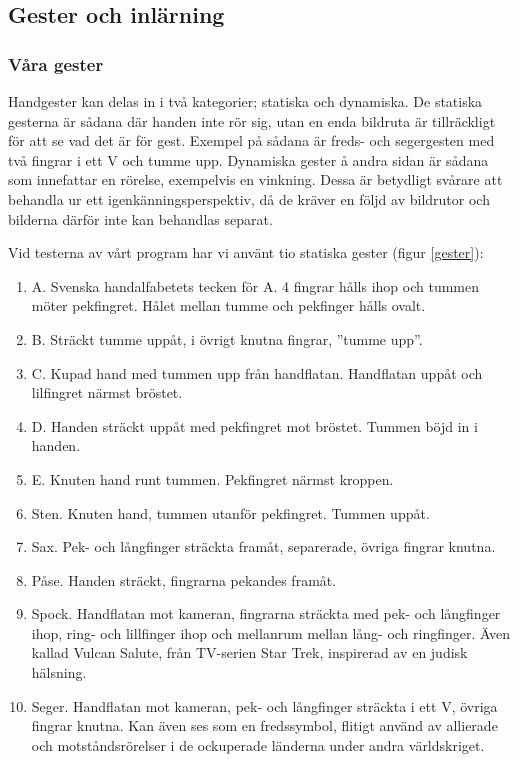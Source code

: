 \documentclass[../rapport_MVEX01-11-05]{subfiles}
\begin{document}
\subsection{Gester och inlärning}
\subsubsection{Våra gester}
Handgester kan delas in i två kategorier; statiska och dynamiska. De
statiska gesterna är sådana där handen inte rör sig, utan en enda
bildruta är tillräckligt för att se vad det är för gest. Exempel på
sådana är freds- och segergesten med två fingrar i ett V och tumme
upp. Dynamiska gester å andra sidan är sådana som innefattar en
rörelse, exempelvis en vinkning. Dessa är betydligt svårare att
behandla ur ett igenkänningsperspektiv, då de kräver en följd av
bildrutor och bilderna därför inte kan behandlas separat.

Vid testerna av vårt program har vi använt tio statiska gester (figur
\ref{gester}):


\begin{enumerate}
\item A. Svenska handalfabetets tecken för A. 4 fingrar hålls ihop och tummen
  möter pekfingret. Hålet mellan tumme och pekfinger hålls ovalt.

\item B. Sträckt tumme uppåt, i övrigt knutna fingrar, ''tumme upp''.

\item C. Kupad hand med tummen upp från handflatan. Handflatan uppåt
  och lilfingret närmst bröstet. 

\item D. Handen sträckt uppåt med pekfingret mot bröstet. Tummen böjd
  in i handen.

\item E. Knuten hand runt tummen. Pekfingret närmst kroppen. 

\item Sten. Knuten hand, tummen utanför pekfingret. Tummen uppåt.

\item Sax. Pek- och långfinger sträckta framåt, separerade, övriga
  fingrar knutna.

\item Påse. Handen sträckt, fingrarna pekandes framåt.

\item Spock. Handflatan mot kameran, fingrarna sträckta med pek- och
  långfinger ihop, ring- och lillfinger ihop och mellanrum mellan
  lång- och ringfinger. Även kallad Vulcan Salute, från TV-serien Star
  Trek, inspirerad av en judisk hälsning.

\item Seger. Handflatan mot kameran, pek- och långfinger sträckta i
  ett V, övriga fingrar knutna. Kan även ses som en fredssymbol,
  flitigt använd av allierade och motståndsrörelser i de ockuperade
  länderna under andra världskriget.
\end{enumerate}
\end{document}
